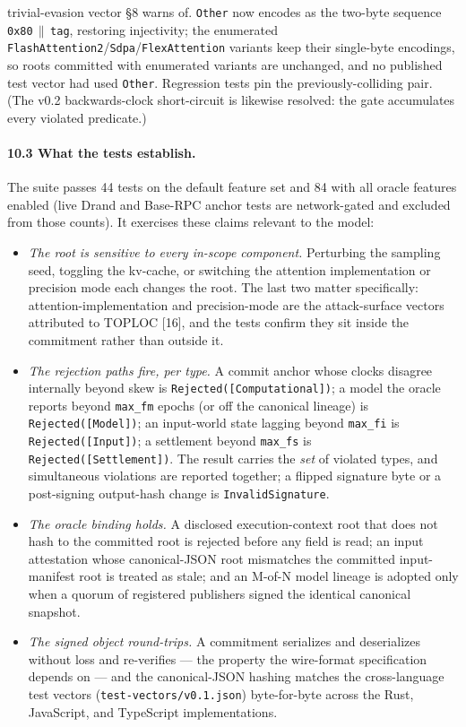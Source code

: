 \documentclass[11pt]{article}
\begin{document}
trivial-evasion vector \S8 warns of. \texttt{Other} now encodes as the two-byte sequence \texttt{0x80}\,$\|$\,\texttt{tag}, restoring injectivity; the enumerated \texttt{FlashAttention2}/\texttt{Sdpa}/\texttt{FlexAttention} variants keep their single-byte encodings, so roots committed with enumerated variants are unchanged, and no published test vector had used \texttt{Other}. Regression tests pin the previously-colliding pair. (The v0.2 backwards-clock short-circuit is likewise resolved: the gate accumulates every violated predicate.)

\paragraph{10.3 What the tests establish.} The suite passes 44 tests on the default feature set and 84 with all oracle features enabled (live Drand and Base-RPC anchor tests are network-gated and excluded from those counts). It exercises these claims relevant to the model:

\begin{itemize}
\item \emph{The root is sensitive to every in-scope component.} Perturbing the sampling seed, toggling the kv-cache, or switching the attention implementation or precision mode each changes the root. The last two matter specifically: attention-implementation and precision-mode are the attack-surface vectors attributed to TOPLOC [16], and the tests confirm they sit inside the commitment rather than outside it.
\item \emph{The rejection paths fire, per type.} A commit anchor whose clocks disagree internally beyond skew is \texttt{Rejected([Computational])}; a model the oracle reports beyond \texttt{max\_fm} epochs (or off the canonical lineage) is \texttt{Rejected([Model])}; an input-world state lagging beyond \texttt{max\_fi} is \texttt{Rejected([Input])}; a settlement beyond \texttt{max\_fs} is \texttt{Rejected([Settlement])}. The result carries the \emph{set} of violated types, and simultaneous violations are reported together; a flipped signature byte or a post-signing output-hash change is \texttt{InvalidSignature}.
\item \emph{The oracle binding holds.} A disclosed execution-context root that does not hash to the committed root is rejected before any field is read; an input attestation whose canonical-JSON root mismatches the committed input-manifest root is treated as stale; and an M-of-N model lineage is adopted only when a quorum of registered publishers signed the identical canonical snapshot.
\item \emph{The signed object round-trips.} A commitment serializes and deserializes without loss and re-verifies --- the property the wire-format specification depends on --- and the canonical-JSON hashing matches the cross-language test vectors (\texttt{test-vectors/v0.1.json}) byte-for-byte across the Rust, JavaScript, and TypeScript implementations.
\end{itemize}
\end{document}
